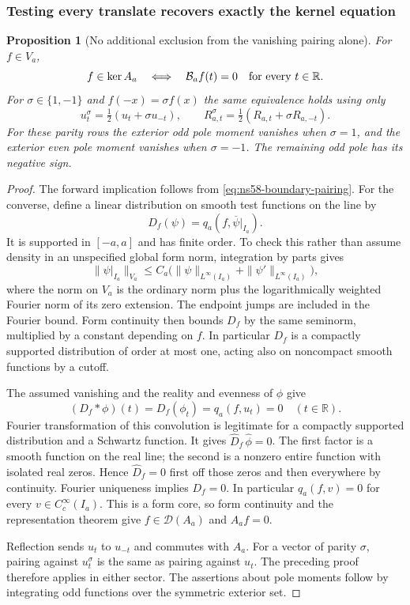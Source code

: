 \documentclass[11pt]{article}
\newtheorem{proposition}[theorem]{Proposition}
\theoremstyle{remark}
\begin{document}
\subsubsection*{Testing every translate recovers exactly the kernel equation}

\begin{proposition}[No additional exclusion from the vanishing pairing alone]
\label{prop:ns58-equivalence}
For $f\in V_a$,
\begin{equation}\label{eq:ns58-equivalence}
 f\in\ker A_a
 \quad\Longleftrightarrow\quad
 \mathcal B_a f(t)=0\quad\hbox{for every }t\in\mathbb R.
\end{equation}
For $\sigma\in\{1,-1\}$ and $f(-x)=\sigma f(x)$ the same
equivalence holds using only
\[
 u_t^\sigma=\tfrac12(u_t+\sigma u_{-t}),\qquad
 R_{a,t}^\sigma=\tfrac12(R_{a,t}+\sigma R_{a,-t}).
\]
For these parity rows the exterior odd pole moment vanishes when
$\sigma=1$, and the exterior even pole moment vanishes when
$\sigma=-1$. The remaining odd pole has its negative sign.
\end{proposition}
\begin{proof}
The forward implication follows from
\eqref{eq:ns58-boundary-pairing}. For the converse, define a linear
distribution on smooth test functions on the line by
\[
 D_f(\psi)=q_a(f,\overline{\psi}|_{I_a}).
\]
It is supported in $[-a,a]$ and has finite order. To check this rather
than assume density in an unspecified global form norm, integration
by parts gives
\[
 \|\psi|_{I_a}\|_{V_a}
 \le C_a\bigl(\|\psi\|_{L^\infty(I_a)}
                +\|\psi'\|_{L^\infty(I_a)}\bigr),
\]
where the norm on $V_a$ is the ordinary norm plus the logarithmically
weighted Fourier norm of its zero extension. The endpoint jumps are
included in the Fourier bound. Form continuity then bounds $D_f$
by the same seminorm, multiplied by a constant depending on $f$.
In particular $D_f$ is a compactly supported distribution of order
at most one, acting also on noncompact smooth functions by a cutoff.

The assumed vanishing and the reality and evenness of $\phi$ give
\[
 (D_f*\phi)(t)=D_f(\phi_t)=q_a(f,u_t)=0\quad(t\in\mathbb R).
\]
Fourier transformation of this convolution is legitimate for a
compactly supported distribution and a Schwartz function. It gives
$\widehat D_f\,\widehat\phi=0$. The first factor is a smooth
function on the real line; the second is a nonzero entire function
with isolated real zeros. Hence $\widehat D_f=0$ first off those
zeros and then everywhere by continuity. Fourier uniqueness implies
$D_f=0$. In particular $q_a(f,v)=0$ for every
$v\in C_c^\infty(I_a)$. This is a form core, so form continuity
and the representation theorem give $f\in\mathcal D(A_a)$ and
$A_af=0$.

Reflection sends $u_t$ to $u_{-t}$ and commutes with $A_a$.
For a vector of parity $\sigma$, pairing against $u_t^\sigma$
is the same as pairing against $u_t$. The preceding proof therefore
applies in either sector. The assertions about pole moments follow
by integrating odd functions over the symmetric exterior set.
\end{proof}
\end{document}
